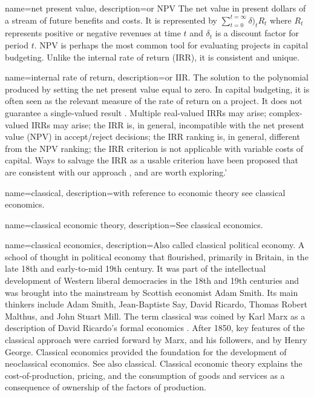 {
name=net present value,
description={or NPV The net value in present dollars of a stream of future benefits and costs. It is represented by $\sum_{t=0} ^{t=\infty} \delta)_t R_t$ where $R_t$ represents positive or negative revenues at time $t$ and $\delta_t$ is a \gls{discount factor} for period $t$. NPV is perhaps the most common tool for evaluating projects in capital budgeting. Unlike the \gls{internal rate of return} (IRR), it is consistent and unique.}
}

{
name=internal rate of return,
description={or IIR. The solution to the polynomial produced by setting the \gls{net present value} equal to zero. In capital budgeting, it is often seen as the relevant measure of the rate of return on a project. It does not guarantee a single-valued result \cite{robinsonOptimalTerminationIRR1996}. Multiple real-valued  IRRs may arise;  complex-valued IRRs may arise;  the IRR is, in general, incompatible with the net present value (NPV) in accept/reject decisions; the IRR ranking is, in general, different from the NPV ranking; the IRR criterion is not applicable with variable costs of capital. Ways to salvage the IRR as a usable criterion have been proposed that are consistent with our approach \cite{magniAverageInternalRate2010}, and are worth exploring.'}
}

{
name=classical,
description={with reference to economic theory see \gls{classical economics}.}
}

{
name=classical economic theory,
description={See \gls{classical economics}.}
}



{
name=classical economics,
description={Also called classical \gls{political economy}. %
A school of thought in political economy that flourished, primarily in Britain, in the late 18th and early-to-mid 19th century. It was part of the intellectual development of  Western liberal democracies in the 18th and 19th centuries and was brought into the mainstream by Scottish economist Adam Smith. Its main thinkers include Adam Smith, Jean-Baptiste Say, David Ricardo, Thomas Robert Malthus, and John Stuart Mill.  The term classical was coined by Karl Marx %
as a description of David Ricardo's formal economics \cite{colanderDeathNeoclassicalEconomics2000}. After 1850, key features of the classical approach were carried forward by Marx, and his followers, and by Henry George. Classical economics provided the foundation for the development of \gls{neoclassical economics}. See also \gls{classical}.  Classical economic theory explains the cost-of-production, pricing, and the consumption of goods and services as a consequence of ownership of the factors of production. }
}


